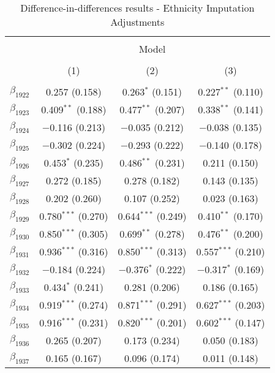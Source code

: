 
\begin{table}[!h] \centering 
  \caption{Difference-in-differences results - Ethnicity Imputation Adjustments} 
  \label{dif_table_pred_adj} 
\small 
\begin{tabular}{@{\extracolsep{5pt}}lccc} 
\\[-1.8ex]\hline 
\hline \\[-1.8ex] 
 & \multicolumn{3}{c}{Model} \\ 
\cline{2-4} 
\\[-1.8ex] & (1) & (2) & (3)\\ 
\hline \\[-1.8ex] 
 $\beta_{1922}$ & 0.257 (0.158) & 0.263$^{*}$ (0.151) & 0.227$^{**}$ (0.110) \\ 
  $\beta_{1923}$ & 0.409$^{**}$ (0.188) & 0.477$^{**}$ (0.207) & 0.338$^{**}$ (0.141) \\ 
  $\beta_{1924}$ & $-$0.116 (0.213) & $-$0.035 (0.212) & $-$0.038 (0.135) \\ 
  $\beta_{1925}$ & $-$0.302 (0.224) & $-$0.293 (0.222) & $-$0.140 (0.178) \\ 
  $\beta_{1926}$ & 0.453$^{*}$ (0.235) & 0.486$^{**}$ (0.231) & 0.211 (0.150) \\ 
  $\beta_{1927}$ & 0.272 (0.185) & 0.278 (0.182) & 0.143 (0.135) \\ 
  $\beta_{1928}$ & 0.202 (0.260) & 0.107 (0.252) & 0.023 (0.163) \\ 
  $\beta_{1929}$ & 0.780$^{***}$ (0.270) & 0.644$^{***}$ (0.249) & 0.410$^{**}$ (0.170) \\ 
  $\beta_{1930}$ & 0.850$^{***}$ (0.305) & 0.699$^{**}$ (0.278) & 0.476$^{**}$ (0.200) \\ 
  $\beta_{1931}$ & 0.936$^{***}$ (0.316) & 0.850$^{***}$ (0.313) & 0.557$^{***}$ (0.210) \\ 
  $\beta_{1932}$ & $-$0.184 (0.224) & $-$0.376$^{*}$ (0.222) & $-$0.317$^{*}$ (0.169) \\ 
  $\beta_{1933}$ & 0.434$^{*}$ (0.241) & 0.281 (0.206) & 0.186 (0.165) \\ 
  $\beta_{1934}$ & 0.919$^{***}$ (0.274) & 0.871$^{***}$ (0.291) & 0.627$^{***}$ (0.203) \\ 
  $\beta_{1935}$ & 0.916$^{***}$ (0.231) & 0.820$^{***}$ (0.201) & 0.602$^{***}$ (0.147) \\ 
  $\beta_{1936}$ & 0.265 (0.207) & 0.173 (0.234) & 0.050 (0.183) \\ 
  $\beta_{1937}$ & 0.165 (0.167) & 0.096 (0.174) & 0.011 (0.148) \\ 

\end{tabular}
\end{table}
